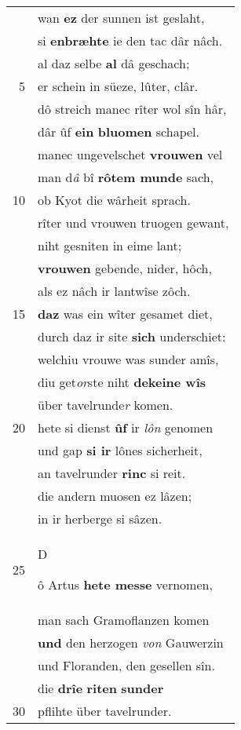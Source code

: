 \documentclass[8pt,a4paper,notitlepage]{article}
\begin{document}
\begin{table}[ht]
\begin{minipage}[t]{0.5\linewidth}
\begin{tabular}{rl}
 & wan \textbf{ez} der sunnen ist geslaht,\\ 
 & si \textbf{en}\textbf{bræhte} ie den tac dâr nâch.\\ 
 & al daz selbe \textbf{al} dâ geschach;\\ 
5 & er schein in süeze, lûter, clâr.\\ 
 & dô streich manec rîter wol sîn hâr,\\ 
 & dâr ûf \textbf{ein} \textbf{bluomen} schapel.\\ 
 & manec ungevelschet \textbf{vrouwen} vel\\ 
 & man d\textit{â} bî \textbf{rôtem munde} sach,\\ 
10 & ob Kyot die wârheit sprach.\\ 
 & rîter und vrouwen truogen gewant,\\ 
 & niht gesniten in eime lant;\\ 
 & \textbf{vrouwen} gebende, nider, hôch,\\ 
 & als ez nâch ir lantwîse zôch.\\ 
15 & \textbf{daz} was ein wîter gesamet diet,\\ 
 & durch daz ir site \textbf{sich} underschiet:\\ 
 & welchiu vrouwe was sunder amîs,\\ 
 & diu get\textit{or}ste niht \textbf{dekeine wîs}\\ 
 & über tavelrunde\textit{r} komen.\\ 
20 & hete si dienst \textbf{ûf} ir \textit{lôn} genomen\\ 
 & und gap \textbf{si ir} lônes sicherheit,\\ 
 & an tavelrunder \textbf{rinc} si reit.\\ 
 & die andern muosen ez lâzen;\\ 
 & in ir herberge si sâzen.\\ 
25 & \begin{large}D\end{large}ô Artus \textbf{hete messe} vernomen,\\ 
 & man sach Gramoflanzen komen\\ 
 & \textbf{und} den herzogen \textit{von} Gauwerzin\\ 
 & und Floranden, den gesellen sîn.\\ 
 & die \textbf{drîe} \textbf{riten} \textbf{sunder}\\ 
30 & pflihte über tavelrunder.\\ 
\end{tabular}
\scriptsize

\end{minipage}
\end{table}
\end{document}
